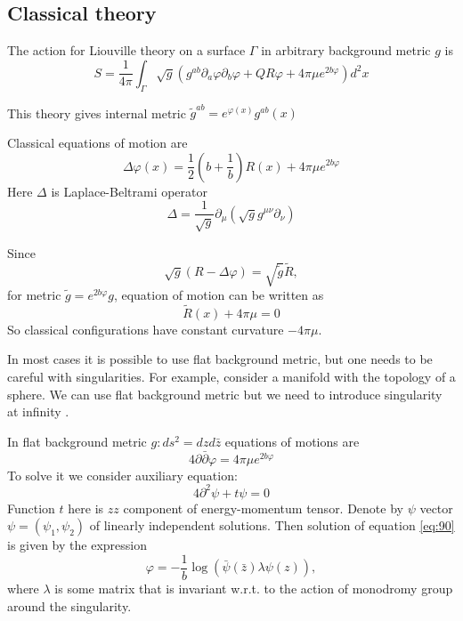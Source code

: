 \documentclass[12pt]{article}
\begin{document}
\subsection{Classical theory}
\label{sec:classical-theory}

The action for Liouville theory on a surface $\Gamma$ in arbitrary background metric $g$ is
\begin{equation}
  \label{eq:13}
  S=\frac{1}{4\pi} \int_{\Gamma} \sqrt{g} \left( g^{ab} \partial_{a}\varphi \partial_{b}\varphi + Q R \varphi +4\pi \mu e^{2b\varphi}\right) d^{2}x
\end{equation}

This theory gives internal metric $\tilde g^{ab}=e^{\varphi(x)}g^{ab}(x)$


Classical equations of motion are
\begin{equation}
  \label{eq:16}
  \Delta \varphi(x) = \frac{1}{2} \left(b+\frac{1}{b}\right) R (x) + 4\pi \mu e^{2 b \varphi}
\end{equation}
Here $\Delta$ is Laplace-Beltrami operator
\begin{equation}
  \label{eq:17}
  \Delta=\frac{1}{\sqrt{g}}\partial_{\mu} \left(\sqrt{g} g^{\mu\nu} \partial_{\nu}\right)
\end{equation}

Since
\begin{equation}
  \label{eq:93}
  \sqrt{g}(R-\Delta \varphi)=\sqrt{\tilde g} \tilde R, 
\end{equation}
for metric $\tilde g= e^{2b\varphi} g$, equation of motion can be written as
\begin{equation}
  \label{eq:94}
  \tilde R(x) + 4\pi \mu=0
\end{equation}
So classical configurations have constant curvature $-4\pi\mu$.

In most cases it is possible to use flat background metric, but one needs to be careful with
singularities. For example, consider a manifold with the topology of a sphere. We can use flat
background metric but we need to introduce singularity at infinity \cite{zamolodchikovlectures}. 

In flat background metric $g: ds^{2}=dz d\bar z$ equations of motions are
\begin{equation}
  \label{eq:90}
  4\partial\bar \partial \varphi = 4\pi\mu e^{2b\varphi}
\end{equation}
To solve it we consider auxiliary equation:
\begin{equation}
  \label{eq:91}
  4\partial^{2} \psi + t\psi=0
\end{equation}
Function $t$ here is $zz$ component of energy-momentum tensor. Denote by $\psi$  vector
$\psi=(\psi_{1},\psi_{2})$ of linearly independent solutions. Then solution of equation
\eqref{eq:90} is given by the expression
\begin{equation}
  \label{eq:92}
  \varphi=-\frac{1}{b} \log \left(\bar \psi(\bar z) \lambda \psi(z)\right),
\end{equation}
where $\lambda$ is some matrix that is invariant w.r.t. to the action of monodromy group around the
singularity. 
\end{document}
